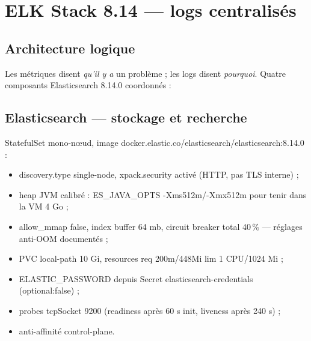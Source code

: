\documentclass[12pt,a4paper]{article}
\begin{document}
\clearpage
\section{ELK Stack 8.14 --- logs centralisés}

\subsection{Architecture logique}
Les métriques disent \emph{qu'il y a} un problème ; les logs disent \emph{pourquoi}. Quatre composants Elasticsearch 8.14.0 coordonnés :

\begin{center}
\end{center}

\subsection{Elasticsearch --- stockage et recherche}
StatefulSet mono-nœud, image docker.elastic.co/elasticsearch/elasticsearch:8.14.0 :
\begin{itemize}[itemsep=1pt]
  \item discovery.type single-node, xpack.security activé (HTTP, pas TLS interne) ;
  \item heap JVM calibré : ES\_JAVA\_OPTS -Xms512m/-Xmx512m pour tenir dans la VM 4 Go ;
  \item allow\_mmap false, index buffer 64 mb, circuit breaker total 40\,\% --- réglages anti-OOM documentés ;
  \item PVC local-path 10 Gi, resources req 200m/448Mi lim 1 CPU/1024 Mi ;
  \item ELASTIC\_PASSWORD depuis Secret elasticsearch-credentials (optional:false) ;
  \item probes tcpSocket 9200 (readiness après 60 s init, liveness après 240 s) ;
  \item anti-affinité control-plane.
\end{itemize}
\end{document}
